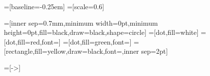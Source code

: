 =[baseline=-0.25em]
=[scale=0.6]

=[inner sep=0.7mm,minimum width=0pt,minimum height=0pt,fill=black,draw=black,shape=circle]
=[dot,fill=white]
=[dot,fill=red,font=\footnotesize\color{white}]
=[dot,fill=green,font=\footnotesize]
=[rectangle,fill=yellow,draw=black,font=\footnotesize,inner sep=2pt]

=[->]
